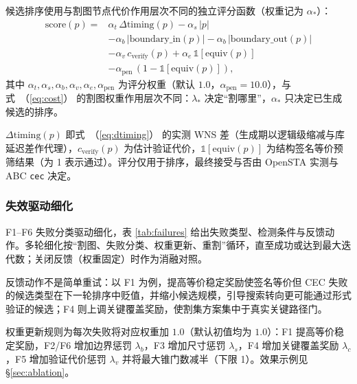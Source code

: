 \documentclass[journal]{IEEEtran}
\renewcommand{\eqref}[1]{\textup{（\ref{#1}）}}
\begin{document}
候选排序使用与割图节点代价作用层次不同的独立评分函数（权重记为 $\alpha_*$）：
{\small
\begin{equation}\label{eq:score}
\begin{split}
\mathrm{score}(p) = {}&\alpha_t\,\Delta\mathrm{timing}(p) - \alpha_s\,|p| \\
&- \alpha_b\,|\mathrm{boundary\_in}(p)| - \alpha_b\,|\mathrm{boundary\_out}(p)| \\
&- \alpha_v\,c_{\mathrm{verify}}(p) + \alpha_e\,\mathbb{1}[\mathrm{equiv}(p)] \\
&- \alpha_{\mathrm{pen}}\,(1-\mathbb{1}[\mathrm{equiv}(p)]),
\end{split}
\end{equation}
}
其中 $\alpha_t,\alpha_s,\alpha_b,\alpha_v,\alpha_e,\alpha_{\mathrm{pen}}$ 为评分权重（默认 $1.0$，$\alpha_{\mathrm{pen}}=10.0$），与式~\eqref{eq:cost} 的割图权重作用层次不同：$\lambda_*$ 决定“割哪里”，$\alpha_*$ 只决定已生成候选的排序。

$\Delta\mathrm{timing}(p)$ 即式~\eqref{eq:dtiming} 的实测 WNS 差（生成期以逻辑级缩减与库延迟差作代理），$c_{\mathrm{verify}}(p)$ 为估计验证代价，$\mathbb{1}[\mathrm{equiv}(p)]$ 为结构签名等价预筛结果（为 1 表示通过）。评分仅用于排序，最终接受与否由 OpenSTA 实测与 ABC \texttt{cec} 决定。

\subsubsection{失效驱动细化}
F1--F6 失败分类驱动细化，表 \ref{tab:failures} 给出失败类型、检测条件与反馈动作。多轮细化按“割图、失败分类、权重更新、重割”循环，直至成功或达到最大迭代数；关闭反馈（权重固定）时作为消融对照。

反馈动作不是简单重试：以 F1 为例，提高等价稳定奖励使签名等价但 CEC 失败的候选类型在下一轮排序中贬值，并缩小候选规模，引导搜索转向更可能通过形式验证的候选；F4 则上调关键覆盖奖励，使割集方案集中于真实关键路径门。

权重更新规则为每次失败将对应权重加 $1.0$（默认初值均为 $1.0$）：F1 提高等价稳定奖励，F2/F6 增加边界惩罚 $\lambda_b$，F3 增加尺寸惩罚 $\lambda_s$，F4 增加关键覆盖奖励 $\lambda_c$，F5 增加验证代价惩罚 $\lambda_v$ 并将最大锥门数减半（下限 1）。效果示例见 \S\ref{sec:ablation}。
\end{document}
